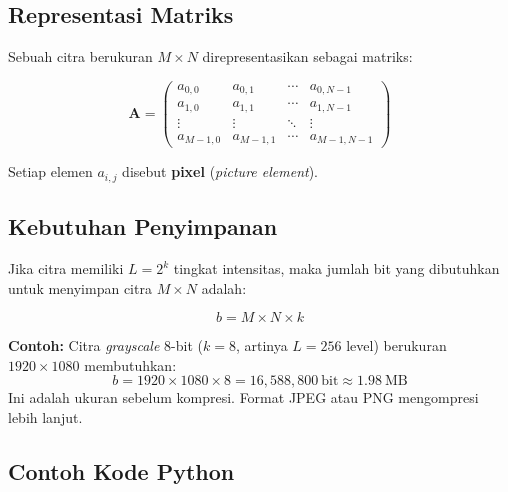 \documentclass[12pt,a4paper]{article}
\begin{document}
\subsection{Representasi Matriks}
 
Sebuah citra berukuran $M \times N$ direpresentasikan sebagai matriks:
 
\begin{equation}
  \mathbf{A} =
  \begin{pmatrix}
    a_{0,0}   & a_{0,1}   & \cdots & a_{0,N-1}   \\
    a_{1,0}   & a_{1,1}   & \cdots & a_{1,N-1}   \\
    \vdots    & \vdots    & \ddots & \vdots      \\
    a_{M-1,0} & a_{M-1,1} & \cdots & a_{M-1,N-1}
  \end{pmatrix}
  \label{eq:matrix}
\end{equation}
 
Setiap elemen $a_{i,j}$ disebut \textbf{pixel} (\textit{picture element}).
 
\subsection{Kebutuhan Penyimpanan}
 
Jika citra memiliki $L = 2^k$ tingkat intensitas, maka jumlah bit yang
dibutuhkan untuk menyimpan citra $M \times N$ adalah:
 
\begin{equation}
  b = M \times N \times k
  \label{eq:storage}
\end{equation}
 
\begin{notebox}
  \textbf{Contoh:} Citra \textit{grayscale} 8-bit ($k=8$, artinya $L=256$ level) berukuran
  $1920 \times 1080$ membutuhkan:
  \[b = 1920 \times 1080 \times 8 = 16{,}588{,}800\ \text{bit} \approx 1.98\ \text{MB}\]
  Ini adalah ukuran sebelum kompresi. Format JPEG atau PNG mengompresi lebih lanjut.
\end{notebox}
 
\subsection{Contoh Kode Python}
 
\end{document}
